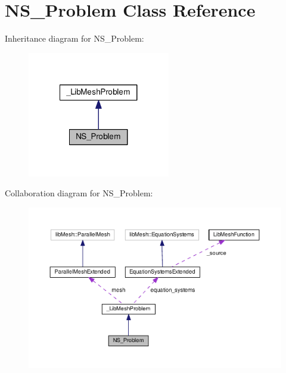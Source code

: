 \hypertarget{class_n_s___problem}{\section{N\-S\-\_\-\-Problem Class Reference}
\label{class_n_s___problem}
}


Inheritance diagram for N\-S\-\_\-\-Problem\-:\nopagebreak
\begin{figure}[H]
\begin{center}
\leavevmode
\includegraphics[width=176pt]{class_n_s___problem__inherit__graph}
\end{center}
\end{figure}


Collaboration diagram for N\-S\-\_\-\-Problem\-:\nopagebreak
\begin{figure}[H]
\begin{center}
\leavevmode
\includegraphics[width=350pt]{class_n_s___problem__coll__graph}
\end{center}
\end{figure}

